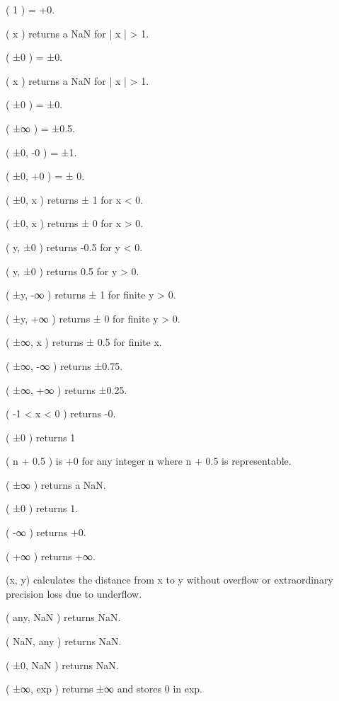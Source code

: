  ( 1 ) = +0.\par
{} ( x ) returns a NaN for | x | > 1.\par
\blank
{} ( ±0 ) = ±0.\par
{} ( x ) returns a NaN for | x | > 1.\par
\blank
{} ( ±0 ) = ±0.\par
{} ( ±∞ ) = ±0.5.\par
\blank
{} ( ±0, -0 ) = ±1.\par
{} ( ±0, +0 ) = ± 0.\par
{} ( ±0, x ) returns ± 1 for x < 0.\par
{} ( ±0, x ) returns ± 0 for x > 0.\par
{} ( y, ±0 ) returns -0.5 for y < 0.\par
{} ( y, ±0 ) returns 0.5 for y > 0.\par
{} ( ±y, -∞ ) returns ± 1 for finite y > 0.\par
{} ( ±y, +∞ ) returns ± 0 for finite y > 0.\par
{} ( ±∞, x ) returns ± 0.5 for finite x.\par
{} ( ±∞, -∞ ) returns ±0.75.\par
{} ( ±∞, +∞ ) returns ±0.25.\par
\blank
{} ( -1 < x < 0 ) returns -0.\par
\blank
{} ( ±0 ) returns 1\par
{} ( n + 0.5 ) is +0 for any integer n where n + 0.5 is representable.\par
{} ( ±∞ ) returns a NaN.\par
\blank
{} ( ±0 ) returns 1.\par
{} ( -∞ ) returns +0.\par
{} ( +∞ ) returns +∞.\par
\blank
{} (x, y) calculates the distance from x to y without overflow or extraordinary
precision loss due to underflow.\par
\blank
{} ( any, NaN ) returns NaN.\par
{} ( NaN, any ) returns NaN.\par
\blank
{} ( ±0, NaN ) returns NaN.\par
\blank
{} ( ±∞, exp ) returns ±∞ and stores 0 in exp.\par
